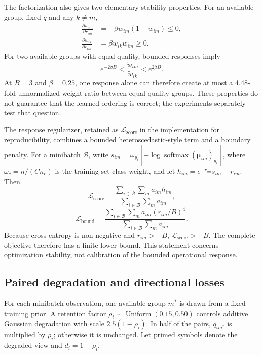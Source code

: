 \documentclass[11pt]{article}
\begin{document}
The factorization also gives two elementary stability properties. For an available group, fixed $q$ and any $k\ne m$,
\begin{equation}
\begin{aligned}
\frac{\partial w_{im}}{\partial r_{im}}&=-\beta w_{im}(1-w_{im})\leq0,\\
\frac{\partial w_{ik}}{\partial r_{im}}&=\beta w_{ik}w_{im}\geq0.
\end{aligned}
\label{eq:monotone}
\end{equation}
For two available groups with equal quality, bounded responses imply
\begin{equation}
e^{-2\beta B}<\frac{\widetilde w_{im}}{\widetilde w_{ik}}<e^{2\beta B}.
\label{eq:ratio}
\end{equation}
At $B=3$ and $\beta=0.25$, one response alone can therefore create at most a 4.48-fold unnormalized-weight ratio between equal-quality groups. These properties do not guarantee that the learned ordering is correct; the experiments separately test that question.

The response regularizer, retained as $\mathcal L_{\mathrm{score}}$ in the implementation for reproducibility, combines a bounded heteroscedastic-style term and a boundary penalty. For a minibatch $\mathcal B$, write $s_{im}=\omega_{y_i}[-\log\operatorname{softmax}(\boldsymbol{\mu}_{im})_{y_i}]$, where $\omega_c=n/(Cn_c)$ is the training-set class weight, and let $h_{im}=e^{-r_{im}}s_{im}+r_{im}$. Then
\begin{equation}
\mathcal L_{\mathrm{score}}=
\frac{\sum_{i\in\mathcal B}\sum_m a_{im}h_{im}}
{\sum_{i\in\mathcal B}\sum_m a_{im}},
\end{equation}
\begin{equation}
\mathcal L_{\mathrm{bound}}=
\frac{\sum_{i\in\mathcal B}\sum_m a_{im}(r_{im}/B)^4}
{\sum_{i\in\mathcal B}\sum_m a_{im}}.
\end{equation}
Because cross-entropy is non-negative and $r_{im}>-B$, $\mathcal L_{\mathrm{score}}>-B$. The complete objective therefore has a finite lower bound. This statement concerns optimization stability, not calibration of the bounded operational response.

\subsection{Paired degradation and directional losses}

For each minibatch observation, one available group $m^*$ is drawn from a fixed training prior. A retention factor $\rho_i\sim\operatorname{Uniform}(0.15,0.50)$ controls additive Gaussian degradation with scale $2.5(1-\rho_i)$. In half of the pairs, $q_{im^*}$ is multiplied by $\rho_i$; otherwise it is unchanged. Let primed symbols denote the degraded view and $d_i=1-\rho_i$.
\end{document}
